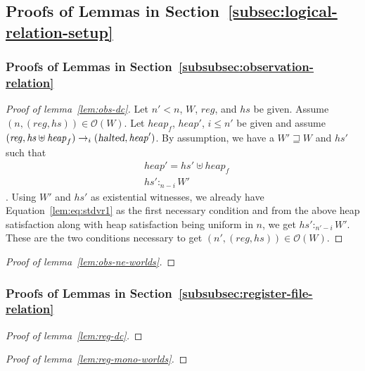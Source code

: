 \documentclass{article}
\newcommand{\var}[1]{\mathit{#1}}
\newcommand{\hs}{\var{hs}}
\newcommand{\reg}{\var{reg}}
\newcommand{\heap}{\var{heap}}
\newcommand{\halted}{\textsl{halted}}
\newcommand{\future}{\mathbin{\sqsupseteq}}
\newcommand{\heapSat}[3][\heap]{#1 :_{#2} #3}
\newcommand{\asmType}{\plaindom{AsmType}}
\newcommand{\plaindom}[1]{\mathrm{#1}}
\newcommand{\intr}[2]{\mathcal{#1}}
\newcommand{\valueintr}[1]{\intr{V}{#1}}
\newcommand{\stdvr}{\valueintr{\asmType}}
\newcommand{\observations}{\mathcal{O}}
\newcommand{\npair}[2][n]{\left(#1,#2 \right)}
\newcommand{\step}[1][]{\rightarrow_{#1}}
\begin{document}
\begin{appendices}
\subsection{Proofs of Lemmas in Section~\ref{subsec:logical-relation-setup}}
\subsubsection{Proofs of Lemmas in Section~\ref{subsubsec:observation-relation}}
\begin{proof}[Proof of lemma~\ref{lem:obs-dc}]
  Let $n' < n$, $W$, $\reg$, and $\hs$ be given. Assume $\npair{(\reg,\hs)} \in \observations(W)$. Let $\heap_f$, $heap'$, $i \leq n'$ be given and assume $(\reg, \hs \uplus \heap_f) \step[i] (\halted, \heap')$. By assumption, we have a $W' \future W$ and $\hs'$ such that
  \begin{align}
&\heap' = \hs' \uplus \heap_f \label{lem:eq:stdvr1}\\
&\heapSat[\hs']{n-i}{W'}\label{lem:eq:stdvr2}
  \end{align}. 
Using $W'$ and $\hs'$ as existential witnesses, we already have Equation~\ref{lem:eq:stdvr1} as the first necessary condition and from the above heap satisfaction along with heap satisfaction being uniform in $n$, we get $\heapSat[\hs']{n'-i}{W'}$. These are the two conditions necessary to get $\npair[n']{(\reg,\hs)} \in \observations(W)$.
\end{proof}

\begin{proof}[Proof of lemma~\ref{lem:obs-ne-worlds}]
\end{proof}

\subsubsection{Proofs of Lemmas in Section~\ref{subsubsec:register-file-relation}}
\begin{proof}[Proof of lemma~\ref{lem:reg-dc}]
\end{proof}

\begin{proof}[Proof of lemma~\ref{lem:reg-mono-worlds}]
\end{proof}


\end{appendices}
\end{document}
